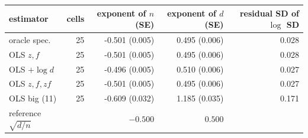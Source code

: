 \begin{tabular}{lrrrr}
\toprule
estimator & cells & exponent of $n$ (SE) & exponent of $d$ (SE) & residual SD of $\log$ SD \\
\midrule
oracle spec. & 25 & -0.501 (0.005) & 0.495 (0.006) & 0.028 \\
OLS $z,f$ & 25 & -0.501 (0.005) & 0.495 (0.006) & 0.028 \\
OLS $+\log d$ & 25 & -0.496 (0.005) & 0.510 (0.006) & 0.027 \\
OLS $z,f,zf$ & 25 & -0.501 (0.005) & 0.495 (0.006) & 0.027 \\
OLS big (11) & 25 & -0.609 (0.032) & 1.185 (0.035) & 0.171 \\
reference $\sqrt{d/n}$ & & $-0.500$ & $0.500$ &  \\
\bottomrule
\end{tabular}
